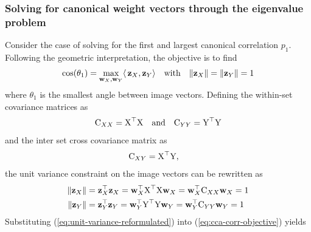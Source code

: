 \subsubsection{Solving for canonical weight vectors through the eigenvalue problem}
Consider the case of solving for the first and largest canonical correlation $p_1$. Following the geometric interpretation, the objective is to find
\begin{equation}
    \cos(\theta_1) = \max_{{\mathbf{w}}_X, {\mathbf{w}}_Y}\langle\,{\mathbf{z}}_X,{\mathbf{z}}_Y\rangle \quad \textrm{with} \quad \|{\mathbf{z}}_X\| = \|{\mathbf{z}}_Y\| = 1
\label{eq:cca-objective-1}
\end{equation}
where $\theta_1$ is the smallest angle between image vectors. Defining the within-set covariance matrices as 
\begin{align}
    {\textrm{C}}_{XX} = {\textrm{X}}^\top{\textrm{X}} \quad \textrm{and} \quad
    {\textrm{C}}_{YY} = {\textrm{Y}}^\top {\textrm{Y}} 
\end{align}
and the inter set cross covariance matrix as 
\begin{align}
    {\textrm{C}}_{XY} &= {\textrm{X}}^\top{\textrm{Y}},
\end{align}
the unit variance constraint on the image vectors can be rewritten as  \begin{align}
\begin{split}
    \|{\mathbf{z}}_X\| &= {\mathbf{z}}_X^\top{\mathbf{z}}_X = {\mathbf{w}}_X^\top {\textrm{X}}^\top {\textrm{X}} {\mathbf{w}}_X =  {\mathbf{w}}_X^\top {\textrm{C}}_{XX} {\mathbf{w}}_X = 1 \\
    \|{\mathbf{z}}_Y\| &= {\mathbf{z}}_Y^\top{\mathbf{z}}_Y = {\mathbf{w}}_Y^\top {\textrm{Y}}^\top {\textrm{Y}} {\mathbf{w}}_Y =  {\mathbf{w}}_Y^\top {\textrm{C}}_{YY} {\mathbf{w}}_Y = 1 
    \end{split}
\label{eq:unit-variance-reformulated}
\end{align}
Substituting (\ref{eq:unit-variance-reformulated}) into (\ref{eq:cca-corr-objective}) yields 

